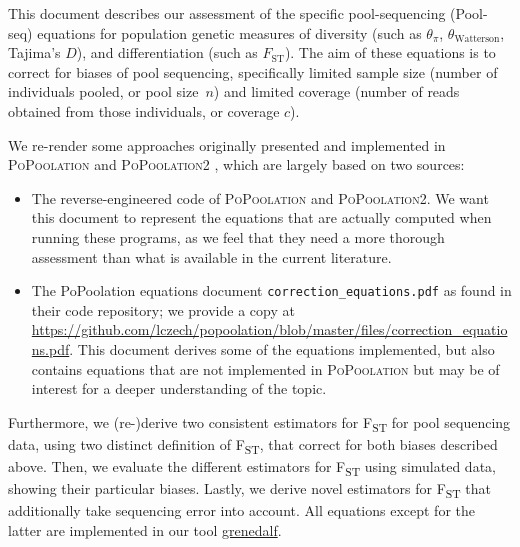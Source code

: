 \documentclass[a4paper,fontsize=9pt,DIV=14]{scrartcl}
\newcommand\toolname{\textsc}
\newcommand{\samplesize}{n}
\newcommand{\coverage}{c}
\newcommand{\fst}{F\textsubscript{ST}}
\newcommand{\mathfst}{F_\text{ST}}
\begin{document}

This document describes our assessment of the specific pool-sequencing (Pool-seq) equations for population genetic measures of diversity (such as $\theta_\pi$, $\theta_\text{Watterson}$, Tajima's $D$), and differentiation (such as $\mathfst$).
The aim of these equations is to correct for biases of pool sequencing, specifically limited sample size (number of individuals pooled, or pool size~$\samplesize$) and limited coverage (number of reads obtained from those individuals, or coverage $\coverage$).

We re-render some approaches originally presented and implemented in \toolname{PoPoolation} \cite{Kofler2011a} and \toolname{PoPoolation2} \cite{Kofler2011b}, which are largely based on two sources:
\begin{itemize}
  \item The reverse-engineered code of \toolname{PoPoolation} and \toolname{PoPoolation2}. We want this document to represent the equations that are actually computed when running these programs, as we feel that they need a more thorough assessment than what is available in the current literature.
  \item The PoPoolation equations document \texttt{correction\_equations.pdf} as found in their code repository; we provide a copy at \url{https://github.com/lczech/popoolation/blob/master/files/correction_equations.pdf}. This document derives some of the equations implemented, but also contains equations that are not implemented in \toolname{PoPoolation} but may be of interest for a deeper understanding of the topic.
\end{itemize}

Furthermore, we (re-)derive two consistent estimators for \fst{} for pool sequencing data, using two distinct definition of \fst{}, that correct for both biases described above.
Then, we evaluate the different estimators for \fst{} using simulated data, showing their particular biases.
Lastly, we derive novel estimators for \fst{} that additionally take sequencing error into account.
All equations except for the latter are implemented in our tool \href{https://github.com/lczech/grenedalf}{grenedalf}.

\end{document}
